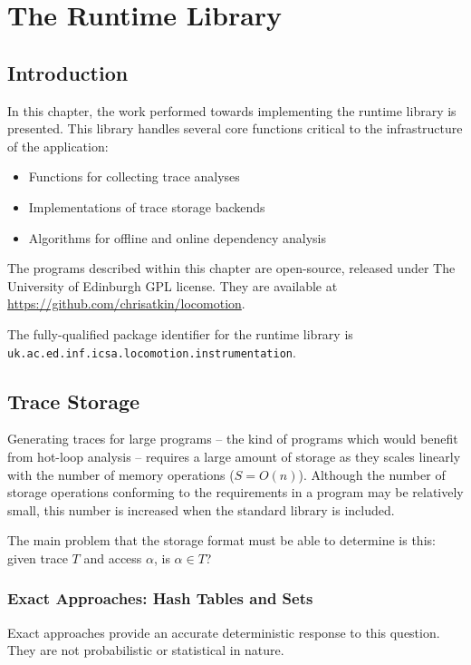 \chapter{The Runtime Library} \label{chp:runtime}
\section{Introduction} \label{sec:runtime/introduction}
In this chapter, the work performed towards implementing the runtime library is presented. This library handles several core functions critical to the infrastructure of the application:

\begin{itemize}
	\item Functions for collecting trace analyses
	\item Implementations of trace storage backends
	\item Algorithms for offline and online dependency analysis
\end{itemize}

The programs described within this chapter are open-source, released under The University of Edinburgh GPL license. They are available at \url{https://github.com/chrisatkin/locomotion}.

The fully-qualified package identifier for the runtime library is\\\texttt{uk.ac.ed.inf.icsa.locomotion.instrumentation}.

\section{Trace Storage} \label{sec:runtime/storage}
Generating traces for large programs -- the kind of programs which would benefit from hot-loop analysis -- requires a large amount of storage as they scales linearly with the number of memory operations ($S=O(n)$). Although the number of storage operations conforming to the requirements in a program may be relatively small, this number is increased when the standard library is included.

The main problem that the storage format must be able to determine is this: given trace $T$ and access $\alpha$, is $\alpha \in T$?
	
	\subsection{Exact Approaches: Hash Tables and Sets} \label{sec:runtime/storage/exact}
	Exact approaches provide an accurate deterministic response to this question. They are not probabilistic or statistical in nature.

